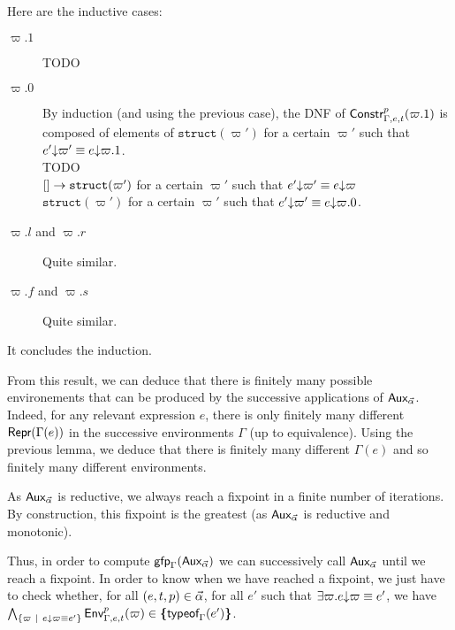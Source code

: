 \documentclass[a4paper]{article}
\theoremstyle{definition}
\begin{document}
    Here are the inductive cases:
    \begin{description}
      \item[$\varpi.1$] TODO %
      \item[$\varpi.0$] By induction (and using the previous case), the DNF of $\typep{p}{\varpi.1}{\Gamma,e,t}$ is composed of elements of
      $\texttt{struct}(\varpi')$ for a certain $\varpi'$ such that $\occ {e'} {\varpi'}\equiv \occ {e} {\varpi.1}$.\\
      TODO\\
      $\arrow {[]} {\texttt{struct}(\varpi')}$ for a certain $\varpi'$ such that $\occ {e'} {\varpi'}\equiv \occ {e} {\varpi}$\\
      $\texttt{struct}(\varpi')$ for a certain $\varpi'$ such that $\occ {e'} {\varpi'}\equiv \occ {e} {\varpi.0}$.
      \item[$\varpi.l$ and $\varpi.r$] Quite similar.
      \item[$\varpi.f$ and $\varpi.s$] Quite similar.
    \end{description}

    It concludes the induction.

    From this result, we can deduce that there is finitely many possible environements that can be produced by the successive applications of $\Gaa \tenv$.
    Indeed, for any relevant expression $e$, there is only finitely many different $\tsrep {\Gamma(e)}$ in the successive environments $\Gamma$ (up to equivalence).
    Using the previous lemma, we deduce that there is finitely many different $\Gamma(e)$ and so finitely many different environments.

    As $\Gaa \tenv$ is reductive, we always reach a fixpoint in a finite number of iterations.
    By construction, this fixpoint is the greatest (as $\Gaa \tenv$ is reductive and monotonic).

    Thus, in order to compute $\fixpoint_\Gamma (\Gaa \tenv)$ we can successively call $\Gaa \tenv$ until we reach a fixpoint.
    In order to know when we have reached a fixpoint, we just have to check whether, for all $(e,t,p) \in \tenv$, for all $e'$ such that
    $\exists \varpi. \occ e \varpi \equiv e'$, we have $\bigwedge_{\{\varpi \alt \occ e \varpi \equiv e'\}} \Gp p {\Gamma,e,t} (\varpi) \in \tsint {\tyof {e'} \Gamma}$.
\end{document}

